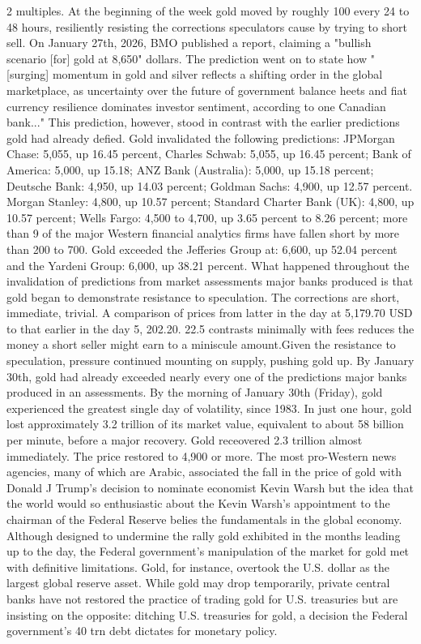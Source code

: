 \documentclass[10pt,a4paper,twoside]{article} %
\begin{document}
\begin{multicols}{2}
multiples. At the beginning of the week gold moved by roughly 100 every 24 to 48 hours, resiliently resisting the corrections speculators cause by trying to short sell. On January 27th, 2026, BMO published a report, claiming a "bullish scenario [for] gold at 8,650" dollars. The prediction went on to state how "[surging] momentum in gold and silver reflects a shifting order in the  global marketplace, as uncertainty over the future of government balance  heets and fiat currency resilience dominates investor sentiment,  according to one Canadian bank..." This prediction, however, stood in contrast with the earlier predictions gold had already defied. Gold invalidated the following predictions: JPMorgan Chase: 5,055, up 16.45 percent, Charles Schwab: 5,055, up 16.45 percent; Bank of America: 5,000, up 15.18; ANZ Bank (Australia): 5,000, up 15.18 percent; Deutsche Bank: 4,950, up 14.03 percent; Goldman Sachs: 4,900, up 12.57 percent. Morgan Stanley: 4,800, up 10.57 percent; Standard Charter Bank (UK): 4,800, up 10.57 percent; Wells Fargo: 4,500 to 4,700, up 3.65 percent to 8.26 percent; more than 9 of the major Western financial analytics firms have fallen short by more than 200 to 700. Gold exceeded the Jefferies Group at: 6,600, up 52.04 percent and the Yardeni Group: 6,000, up 38.21 percent. What happened throughout the invalidation of predictions from market assessments major banks produced is that gold began to demonstrate resistance to speculation. The corrections are short, immediate, trivial. A comparison of prices from latter in the day at 5,179.70 USD to that earlier in the day 5, 202.20. 22.5 contrasts minimally with fees reduces the money a short seller might earn to a miniscule amount.Given the resistance to speculation, pressure continued mounting on supply, pushing gold up. By January 30th, gold had already exceeded nearly every one of the predictions major banks produced in an assessments. \newline \indent By the morning of January 30th (Friday), gold experienced the greatest single day of volatility, since 1983. In just one hour, gold lost approximately 3.2 trillion of its market value, equivalent to about 58 billion per minute, before a major recovery. Gold receovered 2.3 trillion almost immediately. The price restored to 4,900 or more. \newline \indent The most pro-Western news agencies, many of which are Arabic, associated the fall in the price of gold with Donald J Trump's decision to nominate economist Kevin Warsh but the idea that the world would so enthusiastic about the Kevin Warsh's appointment to the chairman of the Federal Reserve belies the fundamentals in the global economy. Although designed to undermine the rally gold exhibited in the months leading up to the day, the Federal government's manipulation of the market for gold met with definitive limitations. Gold, for instance, overtook the U.S. dollar as the largest global reserve asset. While gold may drop temporarily, private central banks have not restored the practice of trading gold for U.S. treasuries but are insisting on the opposite: ditching U.S. treasuries for gold, a decision the Federal government's 40 trn debt dictates for monetary policy. 
\end{multicols}
\end{document}
